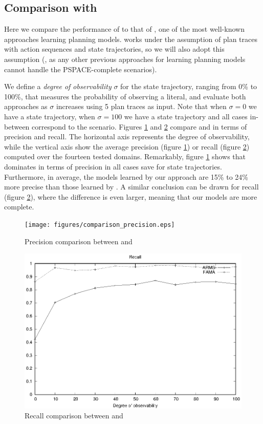 \subsection{Comparison with \ARMS}
Here we compare the performance of \FAMA to that of \ARMS, one of the most well-known approaches learning planning models. \ARMS works under the assumption of plan traces with \FO action sequences and \NO state trajectories, so we will also adopt this assumption (\ARMS, as any other previous approaches for learning planning models cannot handle the PSPACE-complete scenarios).

We define a \emph{degree of observability} $\sigma$ for the state trajectory, ranging from 0\% to 100\%, that measures the probability of observing a literal, and evaluate both approaches as $\sigma$ increases using 5 plan traces as input. Note that when $\sigma = 0$ we have a \NO state trajectory, when $\sigma=100$ we have a \FO state trajectory and all cases in-between correspond to the \PO scenario. Figures \ref{fig:comparison_precision} and \ref{fig:comparison_recall} compare \FAMA and \ARMS in terms of precision and recall. The horizontal axis represents the degree of observability, while the vertical axis show the average precision (figure \ref{fig:comparison_precision}) or recall (figure \ref{fig:comparison_recall}) computed over the fourteen tested domains. Remarkably, figure \ref{fig:comparison_precision} shows that \FAMA dominates in terms of precision in all cases save for \FO state trajectories. Furthermore, in average, the models learned by our approach are 15\% to 24\% more precise than those learned by \ARMS. A similar conclusion can be drawn for recall (figure \ref{fig:comparison_recall}), where the difference is even larger, meaning that our models are more complete.

\begin{figure}[hbt!]
	\centering
	\texttt{[image: figures/comparison\_precision.eps]}
	\caption{Precision comparison between \FAMA and \ARMS}
	\label{fig:comparison_precision}
\end{figure}

\begin{figure}[hbt!]
	\centering
	\includegraphics[width=.8\linewidth]{figures/comparison_recall.eps}
	\caption{Recall comparison between \FAMA and \ARMS}
	\label{fig:comparison_recall}
\end{figure}



